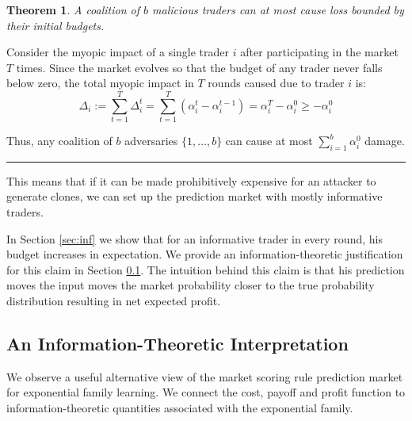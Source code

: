 \documentclass{article}
\newtheorem{theorem}{Theorem}
\newcommand{\qed}{\hfill\rule{7pt}{7pt}}
\newenvironment{proof}{\noindent{\bf Proof:}}{\qed\medskip}
\begin{document}
\begin{theorem}
A coalition of $b$ malicious traders can at most cause loss bounded by their initial budgets.
\end{theorem}
\begin{proof}
Consider the myopic impact of a single trader $i$ after participating in the market $T$ times. Since the market evolves so that the budget of any trader never falls below zero, the total myopic impact in $T$ rounds caused due to trader $i$ is:
$$\Delta_{i}:=\sum_{t=1}^{T}\Delta_{i}^{t}= \sum_{t=1}^{T} (\alpha_{i}^{t} - \alpha_{i}^{t-1}) = \alpha_{i}^{T} - \alpha_{i}^{0}\geq -\alpha_{i}^{0}$$

Thus, any coalition of $b$ adversaries $\{1,\ldots,b\}$ can cause at most $\sum_{i=1}^{b}\alpha_{i}^{0}$ damage.
\end{proof}

This means that if it can be made prohibitively expensive for an attacker to generate clones, we can set up the prediction market with mostly informative traders. 

In Section \ref{sec:inf} we show that for an informative trader in every round, his budget increases in expectation. We provide an information-theoretic justification for this claim in Section \ref{sec:infth}. The intuition behind this claim is that his prediction moves the input moves the market probability closer to the true probability distribution resulting in net expected profit.


\subsection{An Information-Theoretic Interpretation}\label{sec:infth}
 We observe a useful alternative view of the market 
scoring rule prediction market for exponential family learning. We connect the cost, payoff and profit function to information-theoretic 
quantities associated with the exponential family.
\end{document}
